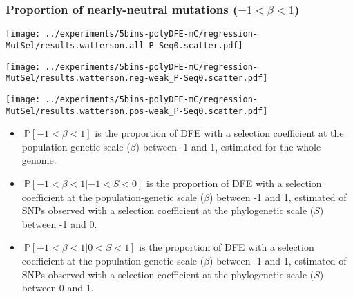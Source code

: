 \documentclass{article}
\newcommand{\proba}{\mathbb{P}}
\newcommand{\Sphy}{S}
\newcommand{\divWeakDel}{-1 < \Sphy < 0}
\newcommand{\divWeakAdv}{0 < \Sphy < 1}
\newcommand{\Spop}{\beta}
\newcommand{\polyNeutral}{-1 < \Spop < 1}
\begin{document}
    \subsubsection{Proportion of nearly-neutral mutations ($\polyNeutral$)}\label{subsec:proportion-nearly-neutral-mutations}
    \begin{minipage}{0.32\linewidth}
        \texttt{[image: ../experiments/5bins-polyDFE-mC/regression-MutSel/results.watterson.all\_P-Seq0.scatter.pdf]}
    \end{minipage}
    \begin{minipage}{0.32\linewidth}
        \texttt{[image: ../experiments/5bins-polyDFE-mC/regression-MutSel/results.watterson.neg-weak\_P-Seq0.scatter.pdf]}
    \end{minipage}
    \begin{minipage}{0.32\linewidth}
        \texttt{[image: ../experiments/5bins-polyDFE-mC/regression-MutSel/results.watterson.pos-weak\_P-Seq0.scatter.pdf]}
    \end{minipage}
    \begin{itemize}
        \item $\ \proba [ \polyNeutral ]$ is the proportion of DFE with a selection coefficient at the population-genetic scale ($\Spop$) between -1 and 1, estimated for the whole genome.
        \item $\ \proba [ \polyNeutral | \divWeakDel]$ is the proportion of DFE with a selection coefficient at the population-genetic scale ($\Spop$) between -1 and 1, estimated of SNPs observed with a selection coefficient at the phylogenetic scale ($\Sphy$) between -1 and 0.
        \item $\ \proba [ \polyNeutral | \divWeakAdv ]$ is the proportion of DFE with a selection coefficient at the population-genetic scale ($\Spop$) between -1 and 1, estimated of SNPs observed with a selection coefficient at the phylogenetic scale ($\Sphy$) between 0 and 1.
    \end{itemize}
\end{document}
